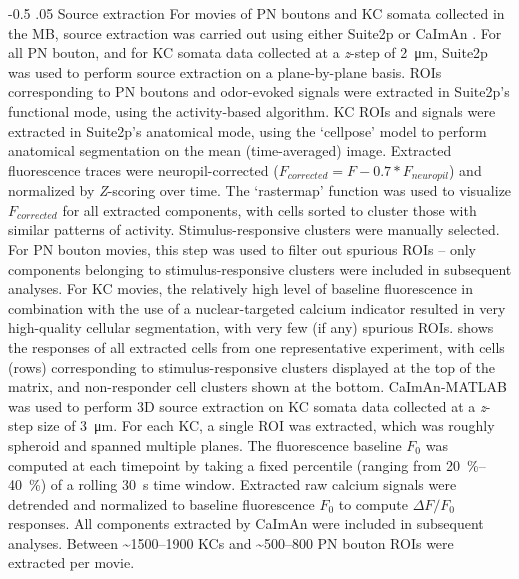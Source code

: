 \documentclass[12pt]{caltech_thesis}
\makeatletter
\renewcommand{\cite}{{ }\autocite}
\renewcommand\paragraph{%
    \@startsection{paragraph}{4}{0mm}%
       {-0.5\baselineskip}%
       {.05\baselineskip}%
       {\normalfont\normalsize\itshape}}
\newcommand{\DeltaFOverF}{\ensuremath{\Delta\text{$F$/$F_0$}}}
\makeatother
\begin{document}
\begin{refsection}
\paragraph{Source extraction}
For movies of PN boutons and KC somata collected in the MB, source extraction was carried out using either Suite2p\cite{Suite2p} or CaImAn\cite{CaImAn}.
For all PN bouton, and for KC somata data collected at a \textit{z}-step of \qty{2}{\micro\metre}, Suite2p was used to perform source extraction on a plane-by-plane basis.
ROIs corresponding to PN boutons and odor-evoked signals were extracted in Suite2p's functional mode, using the activity-based algorithm.
KC ROIs and signals were extracted in Suite2p's anatomical mode, using the `cellpose' model to perform anatomical segmentation on the mean (time-averaged) image.
Extracted fluorescence traces were neuropil-corrected ($F_{corrected} = F - 0.7 * F_{neuropil}$) and normalized by \textit{Z}-scoring over time.
The `rastermap' function\cite{Rastermap} was used to visualize $F_{corrected}$ for all extracted components, with cells sorted to cluster those with similar patterns of activity.
Stimulus-responsive clusters were manually selected.
For PN bouton movies, this step was used to filter out spurious ROIs – only components belonging to stimulus-responsive clusters were included in subsequent analyses.
For KC movies, the relatively high level of baseline fluorescence in combination with the use of a nuclear-targeted calcium indicator resulted in very high-quality cellular segmentation, with very few (if any) spurious ROIs.
 shows the responses of all extracted cells from one representative experiment, with cells (rows) corresponding to stimulus-responsive clusters displayed at the top of the matrix, and non-responder cell clusters shown at the bottom.
CaImAn-MATLAB was used to perform 3D source extraction on KC somata data collected at a \textit{z}-step size of \qty{3}{\micro\metre}.
For each KC, a single ROI was extracted, which was roughly spheroid and spanned multiple planes.
The fluorescence baseline $F_0$ was computed at each timepoint by taking a fixed percentile (ranging from \qtyrange{20}{40}{\percent}) of a rolling \qty{30}{\second} time window.
Extracted raw calcium signals were detrended and normalized to baseline fluorescence $F_0$ to compute \DeltaFOverF\,responses.
All components extracted by CaImAn were included in subsequent analyses.
Between \textasciitilde\numrange{1500}{1900} KCs and \textasciitilde\numrange{500}{800} PN bouton ROIs were extracted per movie.


\end{refsection}
\end{document}
